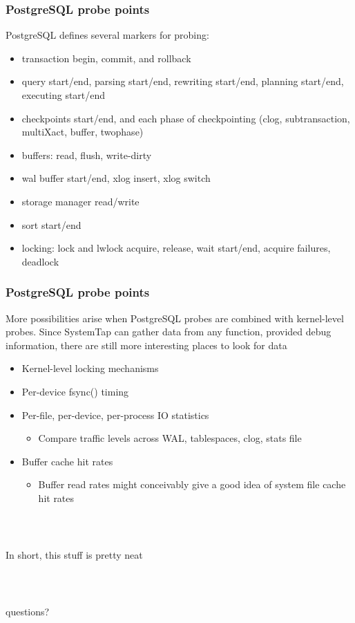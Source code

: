 \documentclass{beamer}
\begin{document}
\begin{frame}
     \frametitle{PostgreSQL probe points}
     PostgreSQL defines several markers for probing:
     \begin{itemize}
         \item transaction begin, commit, and rollback
         \item query start/end, parsing start/end, rewriting start/end, planning start/end, executing start/end
         \item checkpoints start/end, and each phase of checkpointing (clog, subtransaction, multiXact, buffer, twophase)
         \item buffers: read, flush, write-dirty
         \item wal buffer start/end, xlog insert, xlog switch
         \item storage manager read/write
         \item sort start/end
         \item locking: lock and lwlock acquire, release, wait start/end, acquire failures, deadlock
     \end{itemize}
\end{frame}

\begin{frame}
     \frametitle{PostgreSQL probe points}
     More possibilities arise when PostgreSQL probes are combined with kernel-level probes. Since SystemTap can gather data from any function, provided debug information, there are still more interesting places to look for data
     \pause
     \begin{itemize}
         \item Kernel-level locking mechanisms
         \item Per-device fsync() timing
         \item Per-file, per-device, per-process IO statistics
         \begin{itemize}
             \item Compare traffic levels across WAL, tablespaces, clog, stats file
         \end{itemize}
         \item Buffer cache hit rates
         \begin{itemize}
             \item Buffer read rates might conceivably give a good idea of system file cache hit rates
         \end{itemize}
     \end{itemize}
\end{frame}

\begin{frame}
    \frametitle{~}
    \begin{center}
    In short, this stuff is pretty neat
    \end{center}
\end{frame}

\begin{frame}
    \frametitle{~}
    \begin{center}
    questions?
    \end{center}
\end{frame}
\end{document}
